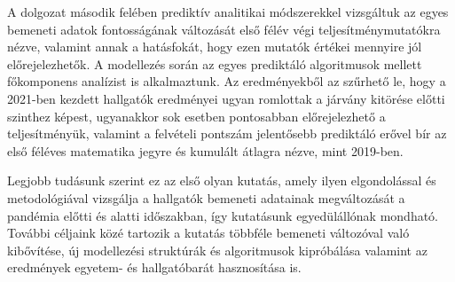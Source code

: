 \documentclass[12pt]{article}
\begin{document}
A dolgozat második felében prediktív analitikai módszerekkel vizsgáltuk az egyes bemeneti adatok fontosságának változását első félév végi teljesítménymutatókra nézve, valamint annak a hatásfokát, hogy ezen mutatók értékei mennyire jól előrejelezhetők. A modellezés során az egyes prediktáló algoritmusok mellett főkomponens analízist is alkalmaztunk. Az eredményekből az szűrhető le, hogy a 2021-ben kezdett hallgatók eredményei ugyan romlottak a járvány kitörése előtti szinthez képest, ugyanakkor sok esetben pontosabban előrejelezhető a teljesítményük, valamint a felvételi pontszám jelentősebb prediktáló erővel bír az első féléves matematika jegyre és kumulált átlagra nézve, mint 2019-ben.

Legjobb tudásunk szerint ez az első olyan kutatás, amely ilyen elgondolással és metodológiával vizsgálja a hallgatók bemeneti adatainak megváltozását a pandémia előtti és alatti időszakban, így kutatásunk egyedülállónak mondható. További céljaink közé tartozik a kutatás többféle bemeneti változóval való kibővítése, új modellezési struktúrák és algoritmusok kipróbálása valamint az eredmények egyetem- és hallgatóbarát hasznosítása is.
\end{document}
